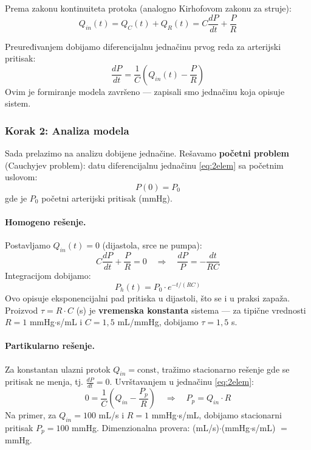 \documentclass[12pt,a4paper]{article}
\begin{document}
Prema zakonu kontinuiteta protoka (analogno Kirhofovom zakonu za struje):
\begin{equation}
    Q_{in}(t) = Q_C(t) + Q_R(t) = C\frac{dP}{dt} + \frac{P}{R}
    \label{eq:kontinuitet}
\end{equation}

Preuređivanjem dobijamo diferencijalnu jednačinu prvog reda za arterijski pritisak:
\begin{equation}
    \frac{dP}{dt} = \frac{1}{C}\left(Q_{in}(t) - \frac{P}{R}\right)
    \label{eq:2elem}
\end{equation}
Ovim je formiranje modela završeno --- zapisali smo jednačinu koja opisuje sistem.

\subsubsection{Korak 2: Analiza modela}

Sada prelazimo na analizu dobijene jednačine. Rešavamo \textbf{početni problem} (Cauchyjev problem): datu diferencijalnu jednačinu \eqref{eq:2elem} sa početnim uslovom:
\begin{equation}
    P(0) = P_0
    \label{eq:pocetni}
\end{equation}
gde je $P_0$ početni arterijski pritisak (mmHg).

\paragraph{Homogeno rešenje.} Postavljamo $Q_{in}(t) = 0$ (dijastola, srce ne pumpa):
\begin{equation}
    C\frac{dP}{dt} + \frac{P}{R} = 0 \quad\Longrightarrow\quad \frac{dP}{P} = -\frac{dt}{RC}
\end{equation}
Integracijom dobijamo:
\begin{equation}
    P_h(t) = P_0\cdot e^{-t/(RC)}
    \label{eq:homogeno}
\end{equation}
Ovo opisuje eksponencijalni pad pritiska u dijastoli, što se i u praksi zapaža. Proizvod $\tau = R\cdot C$ (s) je \textbf{vremenska konstanta} sistema --- za tipične vrednosti $R = 1$ mmHg$\cdot$s/mL i $C = 1{,}5$ mL/mmHg, dobijamo $\tau = 1{,}5$ s.

\paragraph{Partikularno rešenje.} Za konstantan ulazni protok $Q_{in} = \text{const}$, tražimo stacionarno rešenje gde se pritisak ne menja, tj. $\frac{dP}{dt} = 0$. Uvrštavanjem u jednačinu \eqref{eq:2elem}:
\begin{equation}
    0 = \frac{1}{C}\left(Q_{in} - \frac{P_p}{R}\right) \quad\Longrightarrow\quad P_p = Q_{in}\cdot R
    \label{eq:partikularno}
\end{equation}
Na primer, za $Q_{in} = 100$ mL/s i $R = 1$ mmHg$\cdot$s/mL, dobijamo stacionarni pritisak $P_p = 100$ mmHg. Dimenzionalna provera: (mL/s)$\cdot$(mmHg$\cdot$s/mL) $=$ mmHg.
\end{document}

